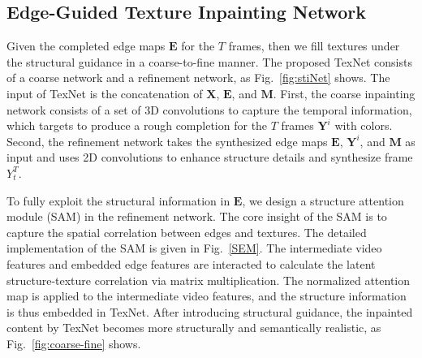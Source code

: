 \subsection{Edge-Guided Texture Inpainting Network}


Given the completed edge maps $\boldsymbol{E}$ for the 
$T$ frames, then we fill textures under the structural guidance in a coarse-to-fine manner. 
%
The proposed TexNet consists of a coarse network and a refinement network, as Fig.~\ref{fig:stiNet} shows.
%
The input of TexNet is the concatenation of $\boldsymbol{X}$, $\boldsymbol{E}$, and $\boldsymbol{M}$.
First, the coarse inpainting network consists of a set of 3D convolutions to capture the temporal information, which targets to produce a rough completion for the $T$ frames  $\boldsymbol{Y}^i$ with colors.
Second, the refinement network takes the synthesized edge maps $\boldsymbol{E}$, $\boldsymbol{Y}^i$, and $\boldsymbol{M}$ as input and uses 2D convolutions to enhance structure details and synthesize frame $Y^T_t$. 



To fully exploit the structural information in $\boldsymbol{E}$, we design a structure attention module (SAM) in the refinement network.
The core insight of the SAM is to capture the spatial correlation between edges and textures.
The detailed implementation of the SAM is given in Fig.~\ref{SEM}.
The intermediate video features and embedded edge features are interacted to calculate the latent structure-texture correlation via matrix multiplication. 
%
The normalized attention map is applied to the intermediate video features, and the structure information is thus embedded in TexNet.
After introducing structural guidance, the inpainted content by TexNet becomes more structurally and semantically realistic, as Fig.~\ref{fig:coarse-fine} shows.



